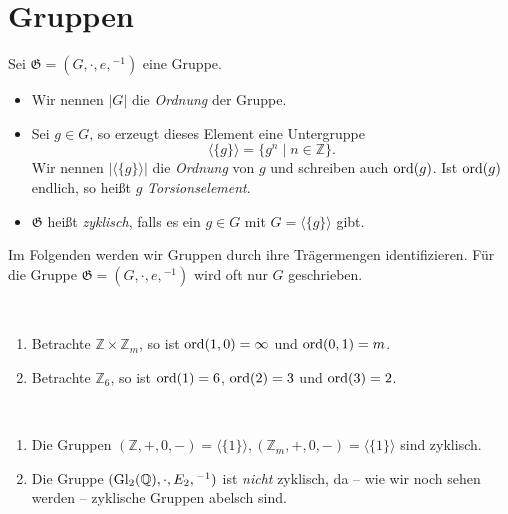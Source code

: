 \section{Gruppen}

\begin{definition}\label{def:gruppe}
    Sei $\mathfrak{G} = (G, \cdot, e, {}^{-1})$ eine Gruppe.
    \begin{itemize}
        \item Wir nennen $|G|$ die \emph{Ordnung} der Gruppe.
        \item Sei $g \in G$, so erzeugt dieses Element eine Untergruppe
        $$ \langle \{ g \} \rangle = \{ g^n \mid n \in \mathbb{Z} \}. $$
        Wir nennen $|\langle\{g\}\rangle|$ die \emph{Ordnung} von $g$ und schreiben auch $\operatorname{ord}(g)$. Ist $\operatorname{ord}(g)$ endlich, so heißt $g$ \emph{Torsionselement}.
        \item $\mathfrak{G}$ heißt \emph{zyklisch}, falls es ein $g \in G$ mit $G = \langle\{g\}\rangle$ gibt.
    \end{itemize}
\end{definition}

\begin{remark}
    Im Folgenden werden wir Gruppen durch ihre Trägermengen identifizieren. Für die Gruppe $\mathfrak{G} = (G, \cdot, e, {}^{-1})$ wird oft nur $G$ geschrieben.
\end{remark}

\begin{example} {\ }
    \begin{enumerate}
        \item Betrachte $\mathbb{Z} \times \mathbb{Z}_m$, so ist $\operatorname{ord}(1,0) = \infty$ und $\operatorname{ord}(0,1) = m$.
        \item Betrachte $\mathbb{Z}_6$, so ist $\operatorname{ord}(1) = 6$, $\operatorname{ord}(2) = 3$ und $\operatorname{ord}(3) = 2$.
    \end{enumerate}
\end{example}

\begin{example} {\ }
    \begin{enumerate}
        \item Die Gruppen $(\mathbb{Z}, +, 0, -) = \langle\{1\}\rangle, (\mathbb{Z}_m, +, 0, -) = \langle\{1\}\rangle$ sind zyklisch.
        \item Die Gruppe $(\operatorname{Gl}_2(\mathbb{Q}), \cdot, E_2, {}^{-1})$ ist \emph{nicht} zyklisch, da -- wie wir noch sehen werden -- zyklische Gruppen abelsch sind.
    \end{enumerate}
\end{example}

